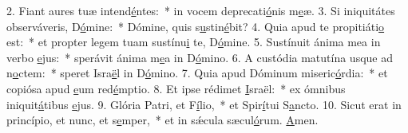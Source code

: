 2. Fiant aures tuæ intend\uline{é}ntes:~* in vocem deprecati\uline{ó}nis m\uline{e}æ.
3. Si iniquitátes observáveris, D\uline{ó}mine:~* Dómine, quis s\uline{u}stin\uline{é}bit?
4. Quia apud te propitiáti\uline{o} est:~* et propter legem tuam sustínu\uline{i} te, D\uline{ó}mine.
5. Sustínuit ánima mea in verbo \uline{e}jus:~* sperávit ánima m\uline{e}a in D\uline{ó}mino.
6. A custódia matutína usque ad n\uline{o}ctem:~* speret Isra\uline{ë}l in D\uline{ó}mino.
7. Quia apud Dóminum miseric\uline{ó}rdia:~* et copiósa apud \uline{e}um red\uline{é}mptio.
8. Et ipse rédimet \uline{I}sraël:~* ex ómnibus iniquit\uline{á}tibus \uline{e}jus.
9. Glória Patri, et F\uline{í}lio,~* et Spir\uline{í}tui S\uline{a}ncto.
10. Sicut erat in princípio, et nunc, et s\uline{e}mper,~* et in sǽcula sæcul\uline{ó}rum. \uline{A}men.
